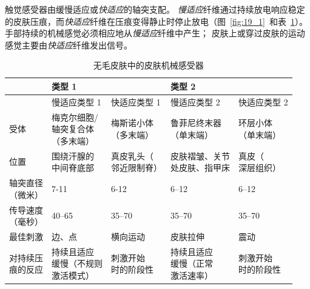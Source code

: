 触觉感受器由缓慢适应或\textit{快适应}的轴突支配。
\textit{慢适应}纤维通过持续放电响应稳定的皮肤压痕，而\textit{快适应}纤维在压痕变得静止时停止放电（图~\ref{fig:19_1}~和表~\ref{tab:19_1}）。
手部持续的机械感觉必须相应地从\textit{慢适应}纤维中产生；
皮肤上或穿过皮肤的运动感觉主要由\textit{快适应}纤维发出信号。


\begin{table}[htbp]
	\caption{无毛皮肤中的皮肤机械感受器} \label{tab:19_1} \centering
	\begin{tabular}{lllll}
		\toprule
		 & 类型 1 &  & 类型 2 & \\
		 \toprule
		 & 慢适应类型 1 & 快适应类型 1  & 慢适应类型 2 & 快适应类型 2 \\
		\midrule
		受体 & \makecell[l]{梅克尔细胞/\\轴突复合体\\（多末端）} & \makecell[l]{梅斯诺小体\\（多末端）} & \makecell[l]{鲁菲尼终末器\\（单末端）} & \makecell[l]{环层小体\\（单末端）} \\
		位置 & \makecell[l]{围绕汗腺的\\中间脊底部} & \makecell[l]{真皮乳头（\\邻近限制脊）} & \makecell[l]{皮肤褶皱、关节\\处皮肤、指甲床} & \makecell[l]{真皮（\\深层组织）} \\
		\makecell[l]{轴突直径\\（微米）} & 7-11 & 6-12 & 6–12 & 6–12 \\
		\makecell[l]{传导速度\\（毫秒）} & 40–65 & 35–70 & 35–70 & 35–70 \\
		最佳刺激 & 边、点 & 横向运动 & 皮肤拉伸 & 震动 \\
		\makecell[l]{对持续压\\痕的反应} & \makecell[l]{持续且适应\\缓慢（不规则\\激活模式）} & \makecell[l]{刺激开始\\时的阶段性} & \makecell{持续且适应\\缓慢（正常\\激活速率）} & \makecell[l]{刺激开始\\时的阶段性} \\
		\bottomrule
	\end{tabular}
\end{table}


